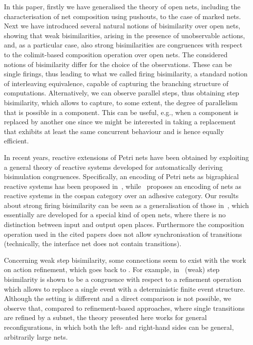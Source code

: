 \documentclass{LMCS}
\begin{document}
In this paper, firstly we have generalised the theory of open nets, 
including the characterisation of net composition using pushouts, to
the case of marked nets. 
Next we have introduced several natural notions of bisimilarity over
open nets, showing that weak bisimilarities, arising in the presence
of unobservable actions, and, as a particular case, also strong
bisimilarities are congruences with respect to the colimit-based
composition operation over open nets.
The considered notions of bisimilarity differ for the choice of the
observations. These can be single firings, thus leading to what we
called firing bisimilarity, a standard notion of interleaving
equivalence, capable of capturing the branching structure of
computations. Alternatively, we can observe parallel steps, thus
obtaining step bisimilarity, which allows to capture, to some extent,
the degree of parallelism that is possible in a component. This can be
useful, e.g., when a component is replaced by another one since we
might be interested in taking a replacement that exhibits at least the
same concurrent behaviour and is hence equally efficient.



In recent years, reactive extensions of Petri nets have been obtained
by exploiting a general theory of reactive systems developed for
automatically deriving bisimulation congruences. Specifically, an
encoding of Petri nets as bigraphical reactive systems has been
proposed in~\cite{Mil:BFPN}, while~\cite{SS:CPN} proposes an encoding
of nets as reactive systems in the cospan category over an adhesive category.
Our results about strong firing bisimilarity can be seen as a
generalisation of those in~\cite{Mil:BFPN,SS:CPN}, which essentially
are developed for a special kind of open nets, where there is no
distinction between  input  and output open places. Furthermore the
composition operation used in the cited papers does not allow
synchronisation of transitions (technically, the interface net does
not contain transitions).

Concerning weak step bisimilarity, some connections seem to exist with
the work on action refinement, which goes back to
\cite{v:petri-stepwise-refine}. For example, in~\cite{Vog:BAR} (weak) step
bisimilarity is shown to be a congruence with respect to a refinement
operation which allows to replace a single event with a deterministic
finite event structure.
Although the setting is different and a direct comparison is not
possible, we observe that, compared to refinement-based approaches,
where single transitions are refined by a subnet, the theory presented
here works for general reconfigurations, in which both the left- and
right-hand sides can be general, arbitrarily large nets.
\end{document}
